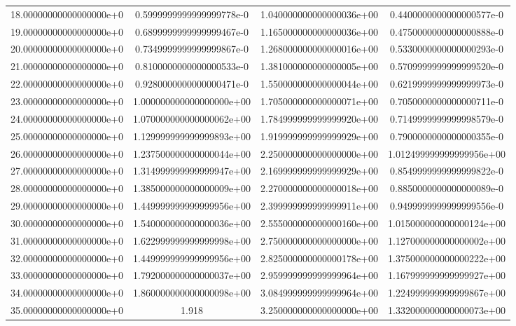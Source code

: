 \begin{table}
\begin{tabular}{S S S S}
    18.00000000000000000e+0 & 0.5999999999999999778e-0 & 1.040000000000000036e+00 & 0.4400000000000000577e-0\\
    19.00000000000000000e+0 & 0.6899999999999999467e-0 & 1.165000000000000036e+00 & 0.4750000000000000888e-0\\
    20.00000000000000000e+0 & 0.7349999999999999867e-0 & 1.268000000000000016e+00 & 0.5330000000000000293e-0\\
    21.00000000000000000e+0 & 0.8100000000000000533e-0 & 1.381000000000000005e+00 & 0.5709999999999999520e-0\\
    22.00000000000000000e+0 & 0.9280000000000000471e-0 & 1.550000000000000044e+00 & 0.6219999999999999973e-0\\
    23.00000000000000000e+0 & 1.000000000000000000e+00 & 1.705000000000000071e+00 & 0.7050000000000000711e-0\\
    24.00000000000000000e+0 & 1.070000000000000062e+00 & 1.784999999999999920e+00 & 0.7149999999999998579e-0\\
    25.00000000000000000e+0 & 1.129999999999999893e+00 & 1.919999999999999929e+00 & 0.7900000000000000355e-0\\
    26.00000000000000000e+0 & 1.237500000000000044e+00 & 2.250000000000000000e+00 & 1.012499999999999956e+00\\
    27.00000000000000000e+0 & 1.314999999999999947e+00 & 2.169999999999999929e+00 & 0.8549999999999999822e-0\\
    28.00000000000000000e+0 & 1.385000000000000009e+00 & 2.270000000000000018e+00 & 0.8850000000000000089e-0\\
    29.00000000000000000e+0 & 1.449999999999999956e+00 & 2.399999999999999911e+00 & 0.9499999999999999556e-0\\
    30.00000000000000000e+0 & 1.540000000000000036e+00 & 2.555000000000000160e+00 & 1.015000000000000124e+00\\
    31.00000000000000000e+0 & 1.622999999999999998e+00 & 2.750000000000000000e+00 & 1.127000000000000002e+00\\
    32.00000000000000000e+0 & 1.449999999999999956e+00 & 2.825000000000000178e+00 & 1.375000000000000222e+00\\
    33.00000000000000000e+0 & 1.792000000000000037e+00 & 2.959999999999999964e+00 & 1.167999999999999927e+00\\
    34.00000000000000000e+0 & 1.860000000000000098e+00 & 3.084999999999999964e+00 & 1.224999999999999867e+00\\
    35.00000000000000000e+0 & 1.918                    & 3.250000000000000000e+00 & 1.332000000000000073e+00\\

\end{tabular}
\end{table}
